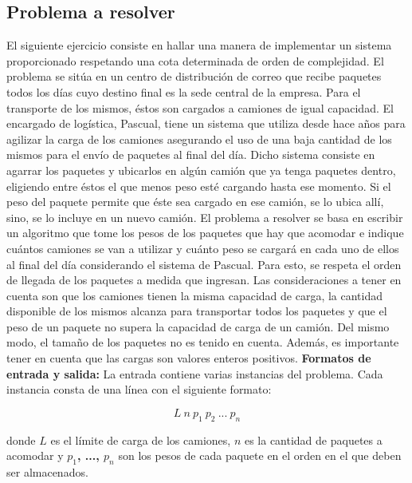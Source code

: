 \subsection{Problema a resolver}
El siguiente ejercicio consiste en hallar una manera de implementar un sistema proporcionado respetando una cota determinada de orden de complejidad. El problema se sitúa en un centro de distribución de correo que recibe paquetes todos los días cuyo destino final es la sede central de la empresa. Para el transporte de los mismos, éstos son cargados a camiones de igual capacidad. El encargado de logística, Pascual, tiene un sistema que utiliza desde hace años para agilizar la carga de los camiones asegurando el uso de una baja cantidad de los mismos para el envío de paquetes al final del día. Dicho sistema consiste en agarrar los paquetes y ubicarlos en algún camión que ya tenga paquetes dentro, eligiendo entre éstos el que menos peso esté cargando hasta ese momento. Si el peso del paquete permite que éste sea cargado en ese camión, se lo ubica allí, sino, se lo incluye en un nuevo camión.\newline
El problema a resolver se basa en escribir un algoritmo que tome los pesos de los paquetes que hay que acomodar e indique cuántos camiones se van a utilizar y cuánto peso se cargará en cada uno de ellos al final del día considerando el sistema de Pascual. Para esto, se respeta el orden de llegada de los paquetes a medida que ingresan. \newline
Las consideraciones a tener en cuenta son que los camiones tienen la misma capacidad de carga, la cantidad disponible de los mismos alcanza para transportar todos los paquetes y que el peso de un paquete no supera la capacidad de carga de un camión. Del mismo modo, el tamaño de los paquetes no es tenido en cuenta. Además, es importante tener en cuenta que las cargas son valores enteros positivos.\newline
\newline
\textbf {Formatos de entrada y salida:}\newline
\newline
La entrada contiene varias instancias del problema. Cada instancia consta de una línea con el siguiente formato:

$$L\ n\ p_{1}\ p_{2}\ ...\ p_{n}$$


donde \textbf{$L$} es el límite de carga de los camiones, \textbf{$n$} es la cantidad de paquetes a acomodar y \textbf{$p_{1}$, ..., $p_{n}$} son los pesos de cada paquete en el orden en el que deben ser almacenados.\newline

